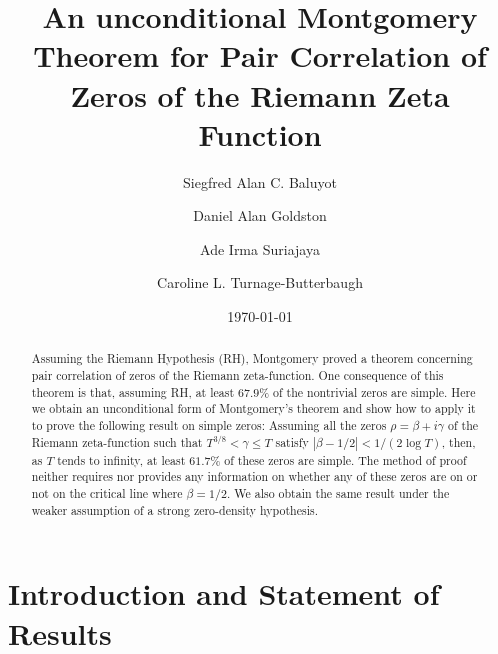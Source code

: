 \documentclass{amsart}
\newcommand{\1}{\mathbbm{1}}
\theoremstyle{remark}
\numberwithin{equation}{section}
\begin{document}
\title[Unconditional Montgomery Pair Correlation]{An unconditional Montgomery Theorem for Pair Correlation of Zeros of the Riemann Zeta Function}

\author[Baluyot]{Siegfred Alan C. Baluyot}
\address{American Institute of Mathematics}

\author[Goldston]{Daniel Alan Goldston}
\address{Department of Mathematics and Statistics, San Jose State University}

\author[Suriajaya]{Ade Irma Suriajaya}
\address{Faculty of Mathematics, Kyushu University}

\author[Turnage-Butterbaugh]{Caroline L. Turnage-Butterbaugh}
\address{Carleton College}



\begin{abstract}
Assuming the Riemann Hypothesis (RH), Montgomery proved a theorem concerning pair correlation of zeros of the Riemann zeta-function. One consequence of this theorem is that, assuming RH, at least $67.9\%$ of the nontrivial zeros are simple. Here we obtain an unconditional form of Montgomery's theorem and show how to apply it to prove the following result on simple zeros: Assuming all the zeros $\rho=\beta+i\gamma$ of the Riemann zeta-function such that $T^{3/8}<\gamma\le T$ satisfy $|\beta-1/2|<1/(2\log T)$,
then, as $T$ tends to infinity, at least $61.7\%$ of these zeros are simple. The method of proof neither requires nor provides any information on whether any of these zeros are on or not on the critical line where $\beta=1/2$. We also obtain the same result under the weaker assumption of a strong zero-density hypothesis. 
\end{abstract}
\date{\today}

\maketitle

\section{Introduction and Statement of Results}
\end{document}

